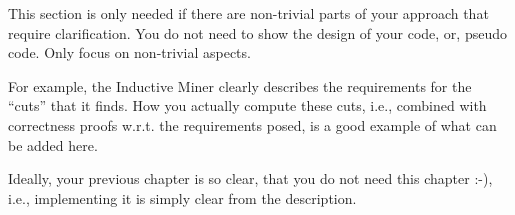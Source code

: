 This section is only needed if there are non-trivial parts of your approach that require clarification.
You do not need to show the design of your code, or, pseudo code.
Only focus on non-trivial aspects.

For example, the Inductive Miner clearly describes the requirements for the \enquote{cuts} that it finds.
How you actually compute these cuts, i.e., combined with correctness proofs w.r.t. the requirements posed, is a good example of what can be added here.

Ideally, your previous chapter is so clear, that you do not need this chapter :-), i.e., implementing it is simply clear from the description.